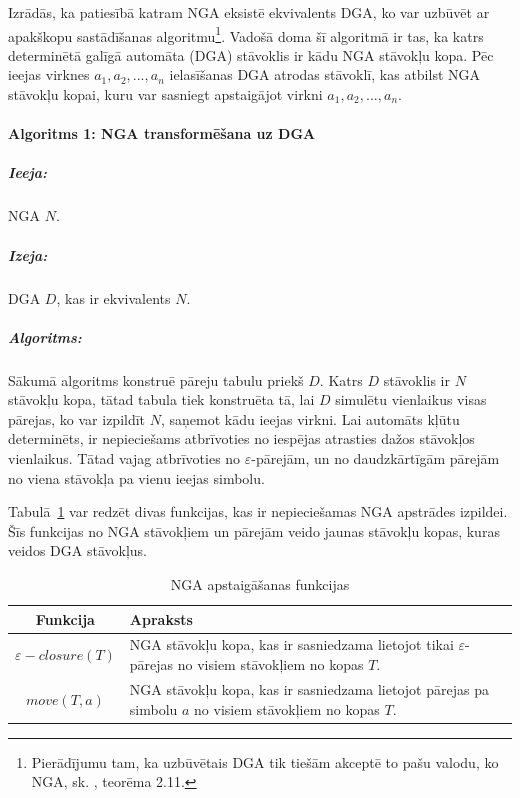 Izrādās, ka patiesībā katram NGA eksistē ekvivalents DGA, ko var uzbūvēt ar apakškopu sastādīšanas algoritmu\footnote{Pierādījumu tam, ka uzbūvētais DGA tik tiešām akceptē to pašu valodu, ko NGA, sk.  \cite{Hopcroft:IntroAutomataTheory}, teorēma 2.11.}. Vadošā doma šī algoritmā ir tas, ka katrs determinētā galīgā automāta (DGA) stāvoklis ir kādu NGA stāvokļu kopa. Pēc ieejas virknes $a_1, a_2, ..., a_n$ ielasīšanas DGA atrodas stāvoklī, kas atbilst NGA stāvokļu kopai, kuru var sasniegt apstaigājot virkni $a_1, a_2, ..., a_n$.

\paragraph*{Algoritms 1: NGA transformēšana uz DGA}
\subparagraph{Ieeja:}NGA $N$.
\subparagraph{Izeja:}DGA $D$, kas ir ekvivalents $N$.
\subparagraph{Algoritms:} Sākumā algoritms konstruē pāreju tabulu priekš $D$. Katrs $D$ stāvoklis ir $N$ stāvokļu kopa, tātad tabula tiek konstruēta tā, lai $D$ simulētu vienlaikus visas pārejas, ko var izpildīt $N$, saņemot kādu ieejas virkni. Lai automāts kļūtu determinēts, ir nepieciešams atbrīvoties no iespējas atrasties dažos stāvokļos vienlaikus. Tātad vajag atbrīvoties no $\varepsilon$-pārejām, un no daudzkārtīgām pārejām no viena stāvokļa pa vienu ieejas simbolu.

Tabulā~\ref{fig:NGAoperations} var redzēt divas funkcijas, kas ir nepieciešamas NGA apstrādes izpildei. Šīs funkcijas no NGA stāvokļiem un pārejām veido jaunas stāvokļu kopas, kuras veidos DGA stāvokļus.

\begin{table}[htdp]
  \caption{NGA apstaigāšanas funkcijas}
  \centering
  \begin{tabular}{|c|p{350pt}|}
    \hline
    Funkcija & Apraksts \\ \hline
    $\varepsilon-closure (T)$ & 
    NGA stāvokļu kopa, kas ir sasniedzama lietojot tikai $\varepsilon$-pārejas no visiem stāvokļiem no kopas $T$. \\ \hline
    $move (T, a)$ & 
    NGA stāvokļu kopa, kas ir sasniedzama lietojot pārejas pa simbolu $a$ no visiem stāvokļiem no kopas $T$. \\
    \hline
  \end{tabular}
\label{fig:NGAoperations}
\end{table}

